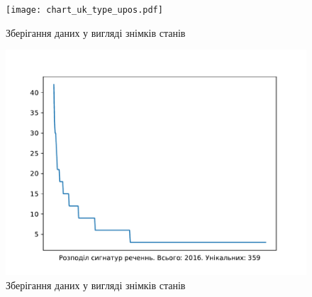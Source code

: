 \begin{figure}[ht]
  \begin{center}
    \texttt{[image: chart\_uk\_type\_upos.pdf]}
  \end{center}
  \caption{Зберігання даних у вигляді знімків станів}
  \label{img:5}
\end{figure}

\begin{figure}[ht]
  \begin{center}
    \includegraphics[width=\linewidth]{article/images/chart_uk_sent_d_w_n.pdf}
  \end{center}
  \caption{Зберігання даних у вигляді знімків станів}
  \label{img:6}
\end{figure}